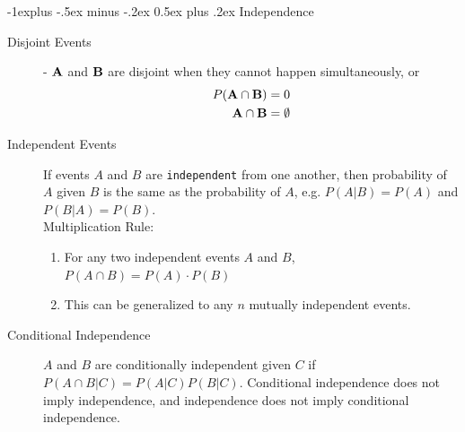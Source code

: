 \documentclass[10pt,landscape]{article}
\makeatletter
\renewcommand{\subsection}{\@startsection{subsection}{2}{0mm}%
                                {-1explus -.5ex minus -.2ex}%
                                {0.5ex plus .2ex}%
                                {\normalfont\normalsize\bfseries}}
\makeatother
\begin{document}
\begin{multicols}{3}
\subsection{Independence}
\begin{description}
\item[Disjoint Events] - ${\bf A}$ and ${\bf B}$ are disjoint when they cannot happen simultaneously, or
   \begin{align*}
     P({\bf A} \cap {\bf B}) &= 0\\
     {\bf A} \cap {\bf B} &= \emptyset
   \end{align*}
\item[Independent Events] If events $A$ and $B$ are \verb|independent| from one another, then probability of $A$ given $B$ is the same as the probability of $A$, e.g. $P(A|B) = P(A)$ and $P(B|A) = P(B)$. \\
	\vspace{5pt}
Multiplication Rule:
\begin{enumerate}
	\item For any two independent events $A$ and $B$, $P(A \cap B) = P(A) \cdot P(B)$
	\item This can be generalized to any $n$ mutually independent events.
\end{enumerate}
\item[Conditional Independence]  ${A}$ and ${B}$ are conditionally independent given ${C}$ if $P({A}\cap {B}|{C}) = P({A}|{C})P({B}|{C})$. Conditional independence does not imply independence, and independence does not imply conditional independence.
\end{description}


\end{multicols}
\end{document}
